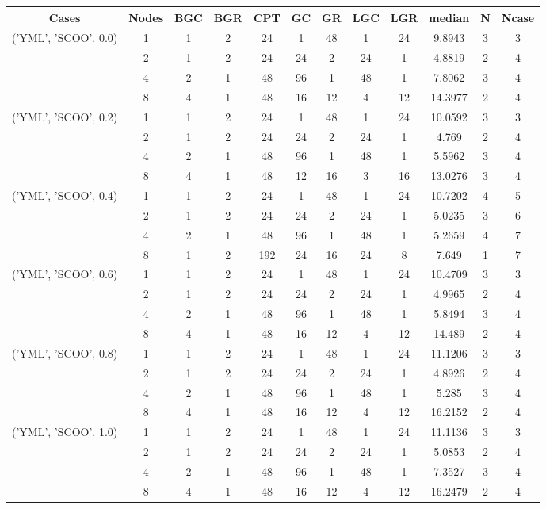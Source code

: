 \begin{tabular}{cccccccccccc}
\hline
Cases & Nodes& BGC& BGR& CPT& GC& GR& LGC& LGR& median & N & Ncase \\
\hline
\multirow{4}{*}{('YML', 'SCOO', 0.0)}& 1& 1& 2& 24& 1& 48& 1& 24& 9.8943& 3& 3\\
& 2& 1& 2& 24& 24& 2& 24& 1& 4.8819& 2& 4\\
& 4& 2& 1& 48& 96& 1& 48& 1& 7.8062& 3& 4\\
& 8& 4& 1& 48& 16& 12& 4& 12& 14.3977& 2& 4\\
\hline
\multirow{4}{*}{('YML', 'SCOO', 0.2)}& 1& 1& 2& 24& 1& 48& 1& 24& 10.0592& 3& 3\\
& 2& 1& 2& 24& 24& 2& 24& 1& 4.769& 2& 4\\
& 4& 2& 1& 48& 96& 1& 48& 1& 5.5962& 3& 4\\
& 8& 4& 1& 48& 12& 16& 3& 16& 13.0276& 3& 4\\
\hline
\multirow{4}{*}{('YML', 'SCOO', 0.4)}& 1& 1& 2& 24& 1& 48& 1& 24& 10.7202& 4& 5\\
& 2& 1& 2& 24& 24& 2& 24& 1& 5.0235& 3& 6\\
& 4& 2& 1& 48& 96& 1& 48& 1& 5.2659& 4& 7\\
& 8& 1& 2& 192& 24& 16& 24& 8& 7.649& 1& 7\\
\hline
\multirow{4}{*}{('YML', 'SCOO', 0.6)}& 1& 1& 2& 24& 1& 48& 1& 24& 10.4709& 3& 3\\
& 2& 1& 2& 24& 24& 2& 24& 1& 4.9965& 2& 4\\
& 4& 2& 1& 48& 96& 1& 48& 1& 5.8494& 3& 4\\
& 8& 4& 1& 48& 16& 12& 4& 12& 14.489& 2& 4\\
\hline
\multirow{4}{*}{('YML', 'SCOO', 0.8)}& 1& 1& 2& 24& 1& 48& 1& 24& 11.1206& 3& 3\\
& 2& 1& 2& 24& 24& 2& 24& 1& 4.8926& 2& 4\\
& 4& 2& 1& 48& 96& 1& 48& 1& 5.285& 3& 4\\
& 8& 4& 1& 48& 16& 12& 4& 12& 16.2152& 2& 4\\
\hline
\multirow{4}{*}{('YML', 'SCOO', 1.0)}& 1& 1& 2& 24& 1& 48& 1& 24& 11.1136& 3& 3\\
& 2& 1& 2& 24& 24& 2& 24& 1& 5.0853& 2& 4\\
& 4& 2& 1& 48& 96& 1& 48& 1& 7.3527& 3& 4\\
& 8& 4& 1& 48& 16& 12& 4& 12& 16.2479& 2& 4\\
\hline
\end{tabular}

